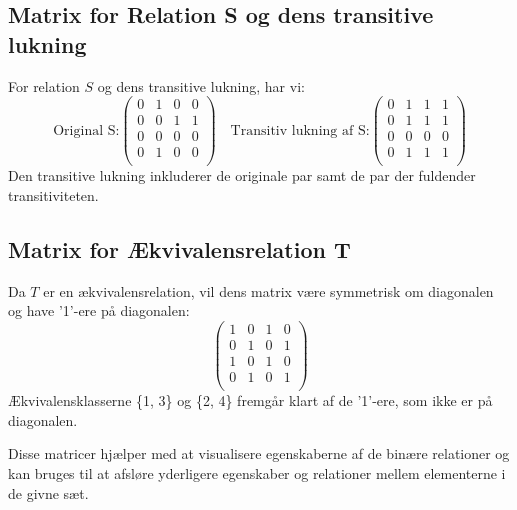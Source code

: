 \documentclass[12pt]{article}
\begin{document}
\subsection{Matrix for Relation S og dens transitive lukning}
For relation \( S \) og dens transitive lukning, har vi:
\[
\text{Original S:}
\begin{pmatrix}
0 & 1 & 0 & 0 \\
0 & 0 & 1 & 1 \\
0 & 0 & 0 & 0 \\
0 & 1 & 0 & 0 \\
\end{pmatrix}
\quad
\text{Transitiv lukning af S:}
\begin{pmatrix}
0 & 1 & 1 & 1 \\
0 & 1 & 1 & 1 \\
0 & 0 & 0 & 0 \\
0 & 1 & 1 & 1 \\
\end{pmatrix}
\]
Den transitive lukning inkluderer de originale par samt de par der fuldender transitiviteten.

\subsection{Matrix for Ækvivalensrelation T}
Da \( T \) er en ækvivalensrelation, vil dens matrix være symmetrisk om diagonalen og have '1'-ere på diagonalen:
\[
\begin{pmatrix}
1 & 0 & 1 & 0 \\
0 & 1 & 0 & 1 \\
1 & 0 & 1 & 0 \\
0 & 1 & 0 & 1 \\
\end{pmatrix}
\]
Ækvivalensklasserne \{1, 3\} og \{2, 4\} fremgår klart af de '1'-ere, som ikke er på diagonalen.

Disse matricer hjælper med at visualisere egenskaberne af de binære relationer og kan bruges til at afsløre yderligere egenskaber og relationer mellem elementerne i de givne sæt.
\end{document}
